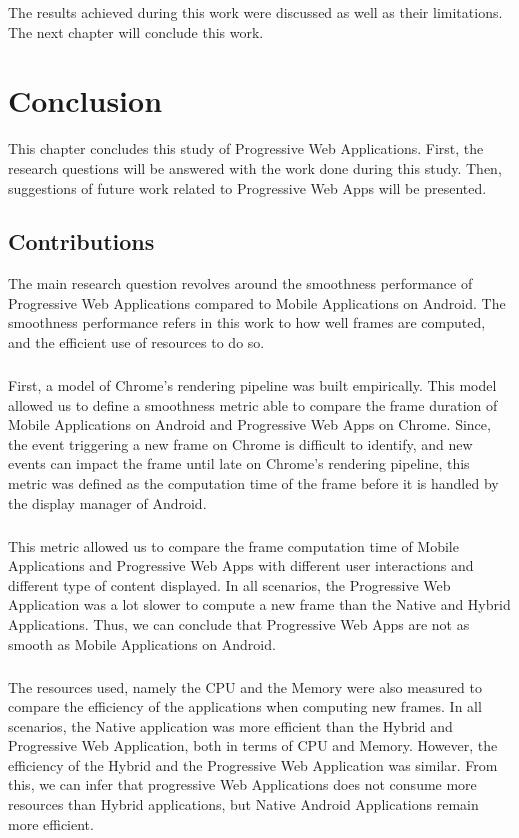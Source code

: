 \documentclass{kththesis}
\begin{document}
The results achieved during this work were discussed as well as their limitations. The next chapter will conclude this work. 


\chapter{Conclusion}

This chapter concludes this study of Progressive Web Applications. First, the research questions will be answered with the work done during this study. Then, suggestions of future work related to Progressive Web Apps will be presented.

\section{Contributions}

The main research question revolves around the smoothness performance of Progressive Web Applications compared to Mobile Applications on Android. The smoothness performance refers in this work to how well frames are computed, and the efficient use of resources to do so. 
\paragraph{}
First, a model of Chrome's rendering pipeline was built empirically. This model allowed us to define a smoothness metric able to compare the frame duration of Mobile Applications on Android and Progressive Web Apps on Chrome. Since, the event triggering a new frame on Chrome is difficult to identify, and new events can impact the frame until late on Chrome's rendering pipeline, this metric was defined as the computation time of the frame before it is handled by the display manager of Android. 
\paragraph{}
This metric allowed us to compare the frame computation time of Mobile Applications and Progressive Web Apps with different user interactions and different type of content displayed. In all scenarios, the Progressive Web Application was a lot slower to compute a new frame than the Native and Hybrid Applications. Thus, we can conclude that Progressive Web Apps are not as smooth as Mobile Applications on Android.
\paragraph{}
The resources used, namely the CPU and the Memory were also measured to compare the efficiency of the applications when computing new frames. In all scenarios, the Native application was more efficient than the Hybrid and Progressive Web Application, both in terms of CPU and Memory. However, the efficiency of the Hybrid and the Progressive Web Application was similar. From this, we can infer that progressive Web Applications does not consume more resources than Hybrid applications, but Native Android Applications remain more efficient.
\end{document}
